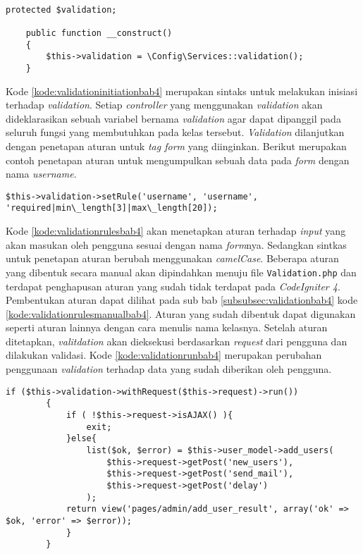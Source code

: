 \begin{lstlisting}[caption=Perancangan inisiasi \textit{validation} pada \texttt{\_\_construct}, label=kode:validationinitiationbab4]

protected $validation;

	public function __construct()
	{
		$this->validation = \Config\Services::validation();
	}
\end{lstlisting}

Kode \ref{kode:validationinitiationbab4} merupakan sintaks untuk melakukan inisiasi terhadap \textit{validation}. Setiap \textit{controller} yang menggunakan \textit{validation} akan dideklarasikan sebuah variabel bernama \textit{validation} agar dapat dipanggil pada seluruh fungsi yang membutuhkan pada kelas tersebut. \textit{Validation} dilanjutkan dengan penetapan aturan untuk \textit{tag form} yang diinginkan. Berikut merupakan contoh penetapan aturan untuk mengumpulkan sebuah data pada \textit{form} dengan nama \textit{username}.

\begin{lstlisting}[caption=Perancangan perubahan konfigurasi aturan pada \textit{library validation}, label=kode:validationrulesbab4]
$this->validation->setRule('username', 'username', 'required|min\_length[3]|max\_length[20]);
\end{lstlisting}

Kode \ref{kode:validationrulesbab4} akan menetapkan aturan terhadap \textit{input} yang akan masukan oleh pengguna sesuai dengan nama \textit{form}nya. Sedangkan sintkas untuk penetapan aturan berubah menggunakan \textit{camelCase}. Beberapa aturan yang dibentuk secara manual akan dipindahkan menuju file \texttt{Validation.php} dan terdapat penghapusan aturan yang sudah tidak terdapat pada \textit{CodeIgniter 4}. Pembentukan aturan dapat dilihat pada sub bab \ref{subsubsec:validationbab4} kode \ref{kode:validationrulesmanualbab4}. Aturan yang sudah dibentuk dapat digunakan seperti aturan lainnya dengan cara menulis nama kelasnya. Setelah aturan ditetapkan, \textit{valitdation} akan dieksekusi berdasarkan \textit{request} dari pengguna dan dilakukan validasi. Kode \ref{kode:validationrunbab4} merupakan perubahan penggunaan \textit{validation} terhadap data yang sudah diberikan oleh pengguna.
\begin{lstlisting}[caption=Perancangan perubahan penggunaan \textit{validation} pada \textit{CodeIgniter 4}, label=kode:validationrunbab4]
if ($this->validation->withRequest($this->request)->run())
		{
			if ( !$this->request->isAJAX() ){
				exit;
			}else{
				list($ok, $error) = $this->user_model->add_users(
					$this->request->getPost('new_users'),
					$this->request->getPost('send_mail'),
					$this->request->getPost('delay')
				);
			return view('pages/admin/add_user_result', array('ok' => $ok, 'error' => $error));
			}
		}
\end{lstlisting}

